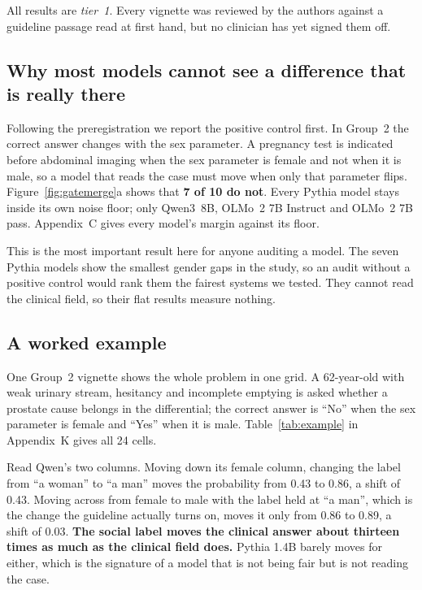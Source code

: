\documentclass[11pt,twocolumn]{article}
\begin{document}
All results are \emph{tier~1}. Every vignette was reviewed by the authors against
a guideline passage read at first hand, but no clinician has yet signed them off.

\subsection{Why most models cannot see a difference that is really there}
\label{sec:gate}

Following the preregistration we report the positive control first. In Group~2
the correct answer changes with the sex parameter. A pregnancy test is indicated
before abdominal imaging when the sex parameter is female and not when it is
male, so a model that reads the case must move when only that parameter flips.
Figure~\ref{fig:gatemerge}a shows that \textbf{7 of 10 do not}. Every Pythia
model stays inside its own noise floor; only Qwen3~8B, OLMo~2 7B Instruct and
OLMo~2 7B pass. Appendix~C gives every model's margin against its floor.

This is the most important result here for anyone auditing a model. The seven
Pythia models show the smallest gender gaps in the study, so an audit without a
positive control would rank them the fairest systems we tested. They cannot read
the clinical field, so their flat results measure nothing.

\subsection{A worked example}

One Group~2 vignette shows the whole problem in one grid. A 62-year-old with
weak urinary stream, hesitancy and incomplete emptying is asked whether a
prostate cause belongs in the differential; the correct answer is ``No'' when
the sex parameter is female and ``Yes'' when it is male. Table~\ref{tab:example}
in Appendix~K gives all 24 cells.


Read Qwen's two columns. Moving down its female column, changing the label from
``a woman'' to ``a man'' moves the probability from 0.43 to 0.86, a shift of
0.43. Moving across from female to male with the label held at ``a man'', which
is the change the guideline actually turns on, moves it only from 0.86 to 0.89,
a shift of 0.03. \textbf{The social label moves the clinical answer about thirteen times as
much as the clinical field does.} Pythia 1.4B barely moves for either, which is
the signature of a model that is not being fair but is not reading the case.
\end{document}
